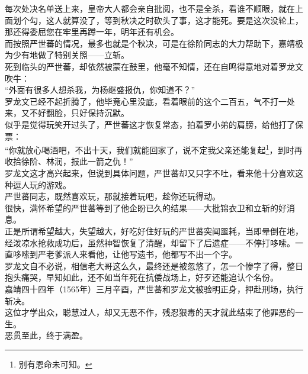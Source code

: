 \begin{multicols}{\theparacolNo}
每次处决名单送上来，皇帝大人都会亲自批阅，也不是全杀，看谁不顺眼，就在上面划个勾，这人就算没了，等到秋决之时砍头了事，这才能死。要是这次没轮上，那还得委屈您在牢里再蹲一年，明年还有机会。\\

而按照严世蕃的情况，最多也就是个秋决，可是在徐阶同志的大力帮助下，嘉靖极为少有地做了特别关照——立斩。\\

死到临头的严世蕃，却依然被蒙在鼓里，他毫不知情，还在自鸣得意地对着罗龙文吹牛：\\

“外面有很多人想杀我，为杨继盛报仇，你知道不？”\\

罗龙文已经不起折腾了，他毕竟心里没底，看着眼前的这个二百五，气不打一处来，又不好翻脸，只好保持沉默。\\

似乎是觉得玩笑开过头了，严世蕃这才恢复常态，拍着罗小弟的肩膀，给他打了保票：\\

“你就放心喝酒吧，不出十天，我们就能回家了，说不定我父亲还能复起\footnote{别有恩命未可知。}，到时再收拾徐阶、林润，报此一箭之仇！”\\

罗龙文这才高兴起来，但说到具体问题，严世蕃却又只字不吐，看来他十分喜欢这种逗人玩的游戏。\\

严世蕃同志，既然喜欢玩，那就接着玩吧，趁你还玩得动。\\

很快，满怀希望的严世蕃等到了他企盼已久的结果——大批锦衣卫和立斩的好消息。\\

正是所谓希望越大，失望越大，好吃好住好玩的严世蕃突闻噩耗，当即晕倒在地，经泼凉水抢救成功后，虽然神智恢复了清醒，却留下了后遗症——不停打哆嗦。一直哆嗦到严老爹派人来看他，让他写遗书，他都写不出一个字。\\

罗龙文自不必说，相信老大哥这么久，最终还是被忽悠了，怎一个惨字了得，整日抱头痛哭，早知如此，还不如当年死在抗倭战场上，好歹还能追认个名份。\\

嘉靖四十四年（1565年）三月辛酉，严世蕃和罗龙文被验明正身，押赴刑场，执行斩决。\\

这位才学出众，聪慧过人，却又无恶不作，残忍狠毒的天才就此结束了他罪恶的一生。\\

恶贯至此，终于满盈。\\


\end{multicols}
